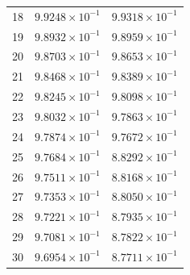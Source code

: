 \begin{table}[H]
\begin{tabular}{@{}rrr@{}}
18 & $9.9248\times10^{-1}$ & $9.9318\times10^{-1}$\\
19 & $9.8932\times10^{-1}$ & $9.8959\times10^{-1}$\\
20 & $9.8703\times10^{-1}$ & $9.8653\times10^{-1}$\\
21 & $9.8468\times10^{-1}$ & $9.8389\times10^{-1}$\\
22 & $9.8245\times10^{-1}$ & $9.8098\times10^{-1}$\\
23 & $9.8032\times10^{-1}$ & $9.7863\times10^{-1}$\\
24 & $9.7874\times10^{-1}$ & $9.7672\times10^{-1}$\\
25 & $9.7684\times10^{-1}$ & $8.8292\times10^{-1}$\\
26 & $9.7511\times10^{-1}$ & $8.8168\times10^{-1}$\\
27 & $9.7353\times10^{-1}$ & $8.8050\times10^{-1}$\\
28 & $9.7221\times10^{-1}$ & $8.7935\times10^{-1}$\\
29 & $9.7081\times10^{-1}$ & $8.7822\times10^{-1}$\\
30 & $9.6954\times10^{-1}$ & $8.7711\times10^{-1}$\\
\bottomrule
\end{tabular}
\end{table}

